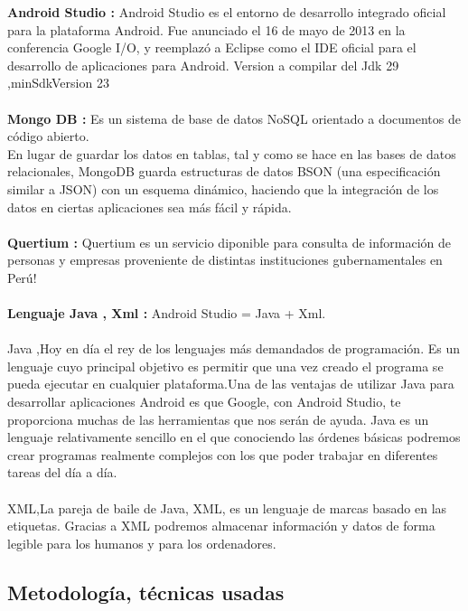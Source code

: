\documentclass[preprint,12pt]{elsarticle}
\begin{document}
\textbf{Android Studio :}  Android Studio es el entorno de desarrollo integrado oficial para la plataforma Android. Fue anunciado el 16 de mayo de 2013 en la conferencia Google I/O, y reemplazó a Eclipse como el IDE oficial para el desarrollo de aplicaciones para Android.
Version a compilar del Jdk 29 ,minSdkVersion 23
\\\\
\textbf{Mongo DB :} Es un sistema de base de datos NoSQL orientado a documentos de código abierto.
\\
En lugar de guardar los datos en tablas, tal y como se hace en las bases de datos relacionales, MongoDB guarda estructuras de datos BSON (una especificación similar a JSON) con un esquema dinámico, haciendo que la integración de los datos en ciertas aplicaciones sea más fácil y rápida.
\\ \\
\textbf{Quertium :} Quertium es un servicio diponible para
consulta de información de personas y empresas
proveniente de distintas instituciones gubernamentales
en Perú!
\\\\
\textbf{Lenguaje Java , Xml  :} Android Studio = Java + Xml.
\\  \\
Java ,Hoy en día el rey de los lenguajes más demandados de programación. Es un lenguaje cuyo principal objetivo es permitir que una vez creado el programa se pueda ejecutar en cualquier plataforma.Una de las ventajas de utilizar Java para desarrollar aplicaciones Android es que Google, con Android Studio, te proporciona muchas de las herramientas que nos serán de ayuda. Java es un lenguaje relativamente sencillo en el que conociendo las órdenes básicas podremos crear programas realmente complejos con los que poder trabajar en diferentes tareas del día a día.
\\  \\
XML,La pareja de baile de Java, XML, es un lenguaje de marcas basado en las etiquetas. Gracias a XML podremos almacenar información y datos de forma legible para los humanos y para los ordenadores.

	 	
	
	
	\subsection{Metodología, técnicas usadas }	
	
\end{document}
